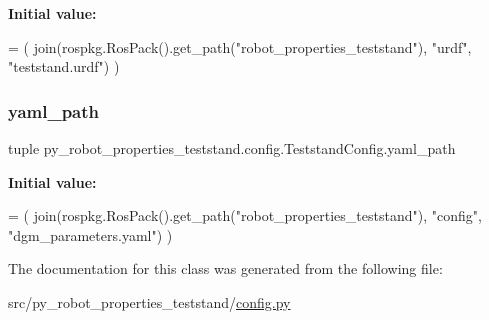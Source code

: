 {\bfseries Initial value\+:}
\begin{DoxyCode}
=  (
        join(rospkg.RosPack().get\_path(\textcolor{stringliteral}{"robot\_properties\_teststand"}),
             \textcolor{stringliteral}{"urdf"},
             \textcolor{stringliteral}{"teststand.urdf"})
    )
\end{DoxyCode}
\mbox{\label{classpy__robot__properties__teststand_1_1config_1_1TeststandConfig_acc7f8bb5b23a6ec613194e217e41fb25}} 
\subsubsection{\texorpdfstring{yaml\+\_\+path}{yaml\_path}}
{\footnotesize\ttfamily tuple py\+\_\+robot\+\_\+properties\+\_\+teststand.\+config.\+Teststand\+Config.\+yaml\+\_\+path\hspace{0.3cm}{\ttfamily [static]}}

{\bfseries Initial value\+:}
\begin{DoxyCode}
=  (
        join(rospkg.RosPack().get\_path(\textcolor{stringliteral}{"robot\_properties\_teststand"}),
             \textcolor{stringliteral}{"config"},
             \textcolor{stringliteral}{"dgm\_parameters.yaml"})
    )
\end{DoxyCode}


The documentation for this class was generated from the following file\+:\begin{DoxyCompactItemize}
\item 
src/py\+\_\+robot\+\_\+properties\+\_\+teststand/\hyperlink{config_8py}{config.\+py}\end{DoxyCompactItemize}
